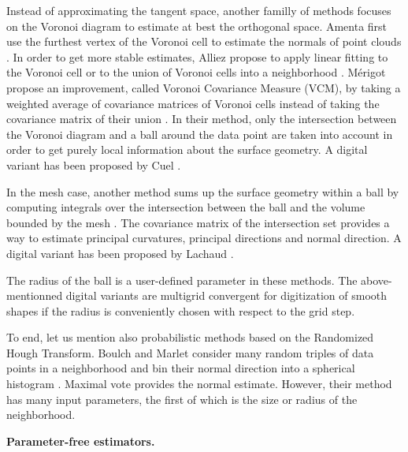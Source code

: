 
Instead of approximating the tangent space, another familly of methods focuses on the
Voronoi diagram to estimate at best the orthogonal space. Amenta \etal first use the
furthest vertex of the Voronoi cell to estimate the normals of point clouds \cite{Amenta1999}.
In order to get more stable estimates, Alliez \etal propose to apply linear fitting
to the Voronoi cell or to the union of Voronoi cells into a neighborhood \cite{Alliez2007}. 
Mérigot \etal propose an improvement, called Voronoi Covariance Measure (VCM),
by taking a weighted average of covariance matrices of Voronoi cells instead of
taking the covariance matrix of their union \cite{Merigot2011}. In their method,
only the intersection between the Voronoi diagram and a ball around the data point
are taken into account in order to get purely local information about the surface geometry.
A digital variant has been proposed by Cuel \etal \cite{Cuel2015}. 

In the mesh case, another method sums up the surface geometry within a ball by 
computing integrals over the intersection between the ball and the volume
bounded by the mesh \cite{Pottmann2009}. The covariance matrix of the intersection set 
provides a way to estimate principal curvatures, principal directions and normal direction.
A digital variant has been proposed by Lachaud \etal \cite{Lachaud2017}.

The radius of the ball is a user-defined parameter in these methods. The above-mentionned
digital variants \cite{Cuel2015,Lachaud2017} are multigrid convergent for digitization
of smooth shapes if the radius is conveniently chosen with respect to the grid step.


To end, let us mention also probabilistic methods based on the Randomized Hough Transform.
Boulch and Marlet consider many random triples of data points in a neighborhood
and bin their normal direction into a spherical histogram \cite{Boulch2012}.
Maximal vote provides the normal estimate. However, their method has many input parameters,
the first of which is the size or radius of the neighborhood. 

\noindent\textbf{Parameter-free estimators.}

